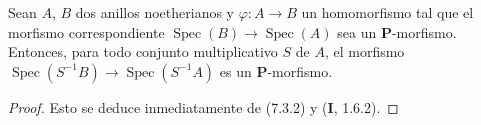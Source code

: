\begin{corollary}[7.3.3]
\label{IV.2.s7.3.3-fr}
Sean $A$, $B$ dos anillos noetherianos y $\varphi:A\to B$ un
homomorfismo tal que el morfismo correspondiente
$\operatorname{Spec}(B)\to\operatorname{Spec}(A)$ sea un
$\boldsymbol P$-morfismo. Entonces, para todo conjunto multiplicativo
$S$ de $A$, el morfismo
$\operatorname{Spec}(S^{-1}B)\to\operatorname{Spec}(S^{-1}A)$ es un
$\boldsymbol P$-morfismo.
\end{corollary}

\begin{proof}
Esto se deduce inmediatamente de (7.3.2) y (\textbf I, 1.6.2).
\end{proof}
